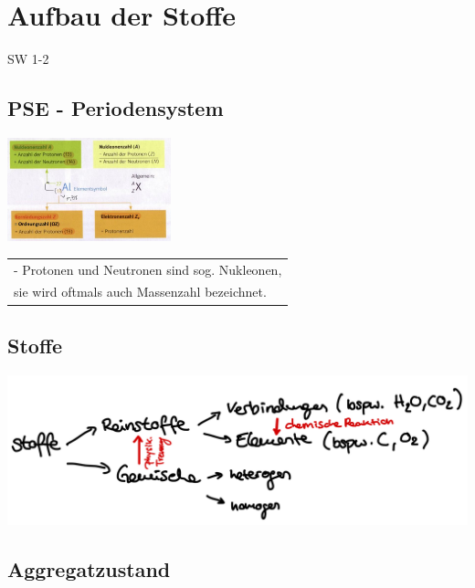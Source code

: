 \section{Aufbau der Stoffe} {SW 1-2 ~}

\subsection{PSE - Periodensystem}
\begin{center}
	\includegraphics[height=3cm]{images/Nukleonenzahl.jpg}
\end{center}

\begin{tabular} {l}
	- Protonen und Neutronen sind sog. Nukleonen, \\
	sie wird oftmals auch Massenzahl bezeichnet. \\
\end{tabular}

\subsection{Stoffe}	
\renewcommand{\arraystretch}{1.2}
\includegraphics[width=\columnwidth]{images/Stoffe_eigenschaften.PNG}

\subsection{Aggregatzustand}		

